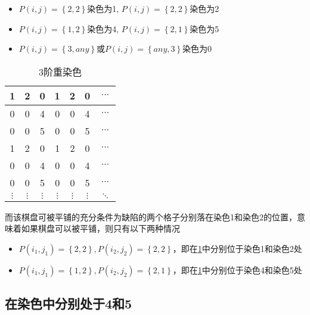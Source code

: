 \begin{itemize}
	\item $P(i, j) = \left\{2, 2\right\}$染色为1, $P(i, j) = \left\{2, 2\right\}$染色为2
	\item $P(i, j) = \left\{1, 2\right\}$染色为4, $P(i, j) = \left\{2, 1\right\}$染色为5
	\item $P(i, j) = \left\{3, any\right\}$或$P(i, j) = \left\{any, 3\right\}$染色为0
\end{itemize}

\begin{table}[h]
	\centering
	\caption{3阶重染色}
	\begin{tabular}{|c|c|c|c|c|c|c|}
		\hline
		1        & 2        & 0        & 1        & 2        & 0        & $\cdots$ \\
		\hline
		0        & 0        & 4        & 0        & 0        & 4        & $\cdots$ \\
		\hline
		0        & 0        & 5        & 0        & 0        & 5        & $\cdots$ \\
		\hline
		1        & 2        & 0        & 1        & 2        & 0        & $\cdots$ \\
		\hline
		0        & 0        & 4        & 0        & 0        & 4        & $\cdots$ \\
		\hline
		0        & 0        & 5        & 0        & 0        & 5        & $\cdots$ \\
		\hline
		$\vdots$ & $\vdots$ & $\vdots$ & $\vdots$ & $\vdots$ & $\vdots$ & $\ddots$ \\
		\hline
	\end{tabular}
	\label{fig:3-order-staining-last}
\end{table}

而该棋盘可被平铺的充分条件为缺陷的两个格子分别落在染色1和染色2的位置，意味着如果棋盘可以被平铺，则只有以下两种情况

\begin{itemize}
	\item $P(i_1, j_1) = \left\{2, 2\right\}, P(i_2, j_2) = \left\{2, 2\right\}$，即在\ref*{fig:3-order-staining-last}中分别位于染色1和染色2处
	\item $P(i_1, j_1) = \left\{1, 2\right\}, P(i_2, j_2) = \left\{2, 1\right\}$，即在\ref*{fig:3-order-staining-last}中分别位于染色4和染色5处
\end{itemize}

\subsection{在染色中分别处于4和5}

